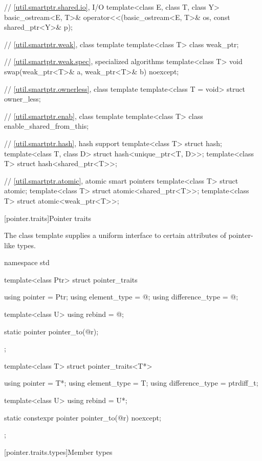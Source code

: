 \begin{codeblock}
{  // \ref{util.smartptr.shared.io},  I/O
  template<class E, class T, class Y>
    basic_ostream<E, T>& operator<<(basic_ostream<E, T>& os, const shared_ptr<Y>& p);

  // \ref{util.smartptr.weak}, class template 
  template<class T> class weak_ptr;

  // \ref{util.smartptr.weak.spec},  specialized algorithms
  template<class T> void swap(weak_ptr<T>& a, weak_ptr<T>& b) noexcept;

  // \ref{util.smartptr.ownerless}, class template 
  template<class T = void> struct owner_less;

  // \ref{util.smartptr.enab}, class template 
  template<class T> class enable_shared_from_this;

  // \ref{util.smartptr.hash}, hash support
  template<class T> struct hash;
  template<class T, class D> struct hash<unique_ptr<T, D>>;
  template<class T> struct hash<shared_ptr<T>>;

  // \ref{util.smartptr.atomic}, atomic smart pointers
  template<class T> struct atomic;
  template<class T> struct atomic<shared_ptr<T>>;
  template<class T> struct atomic<weak_ptr<T>>;
}
\end{codeblock}

[pointer.traits]{Pointer traits}

\pnum
The class template  supplies a uniform interface to certain
attributes of pointer-like types.

%
\begin{codeblock}
namespace std {
  template<class Ptr> struct pointer_traits {
    using pointer         = Ptr;
    using element_type    = @\seebelow@;
    using difference_type = @\seebelow@;

    template<class U> using rebind = @\seebelow@;

    static pointer pointer_to(@\seebelow@ r);
  };

  template<class T> struct pointer_traits<T*> {
    using pointer         = T*;
    using element_type    = T;
    using difference_type = ptrdiff_t;

    template<class U> using rebind = U*;

    static constexpr pointer pointer_to(@\seebelow@ r) noexcept;
  };
}
\end{codeblock}

[pointer.traits.types]{Member types}

